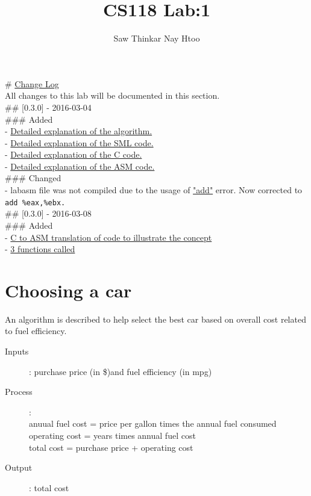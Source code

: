 \documentclass{article}
\begin{document}
\underscoreoff

\title{CS118 Lab:1}
\author{Saw Thinkar Nay Htoo}
\maketitle

\section*{}
\# \href{http://keepachangelog.com}{Change Log} \\
All changes to this lab will be documented in this section. 
\bigskip \\
\#\# [0.3.0] - 2016-03-04 \\
\#\#\# Added \\
- \hyperlink{1}{Detailed explanation of the algorithm.} \\
- \hyperlink{2}{Detailed explanation of the SML code.} \\
- \hyperlink{3}{Detailed explanation of the C code.} \\
- \hyperlink{4}{Detailed explanation of the ASM code.} 
\bigskip \\
\#\#\# Changed \\
- labasm file was not compiled due to the usage of \hyperlink{5}{"add"} error. Now corrected to \verb|add %eax,%ebx.| 
\bigskip \\
\#\# [0.3.0] - 2016-03-08 \\
\#\#\# Added \\
- \hyperlink{6}{C to ASM translation of code to illustrate the concept} \\
- \hyperlink{7}{3 functions called}
\clearpage

\section*{Choosing a car}
An algorithm is described to help select the best car based on overall cost related to fuel efficiency.
\begin{description}
\item[Inputs] : purchase price (in \$)and fuel efficiency (in mpg)
\item[Process] :\\
anuual fuel cost = price per gallon times the annual fuel consumed \\
operating cost = years times annual fuel cost \\
total cost = purchase price + operating cost \\
\item[Output] : total cost
\end{description}
\end{document}
